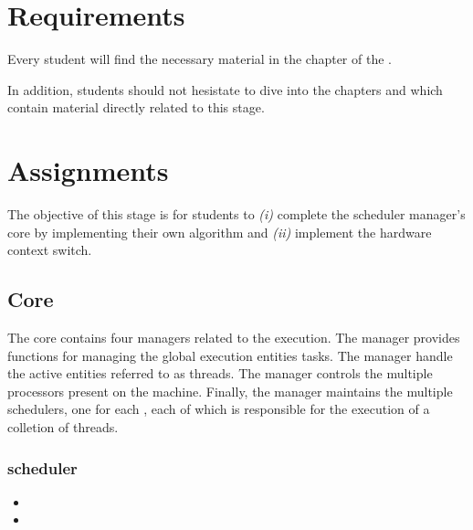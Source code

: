 \newpage

%
%

%
%

\section{Requirements}

Every student will find the necessary material in the chapter  of the .

In addition, students should not hesistate to dive into the chapters
 and  which contain
material directly related to this stage.

%
%

\section{Assignments}

The objective of this stage is for students to \textit{(i)} complete the
scheduler manager's core by implementing their own algorithm and \textit{(ii)}
implement the hardware  context switch.

\subsection{Core}

The core contains four managers related to the execution. The 
manager provides functions for managing the global execution entities \ie{}
tasks. The  manager handle the active entities referred to as
threads. The  manager controls the multiple processors present
on the machine. Finally, the  manager maintains the multiple
schedulers, one for each , each of which is responsible for the
execution of a colletion of threads.

\subsubsection*{scheduler}

\begin{itemize}
  \item
  \item
\end{itemize}

